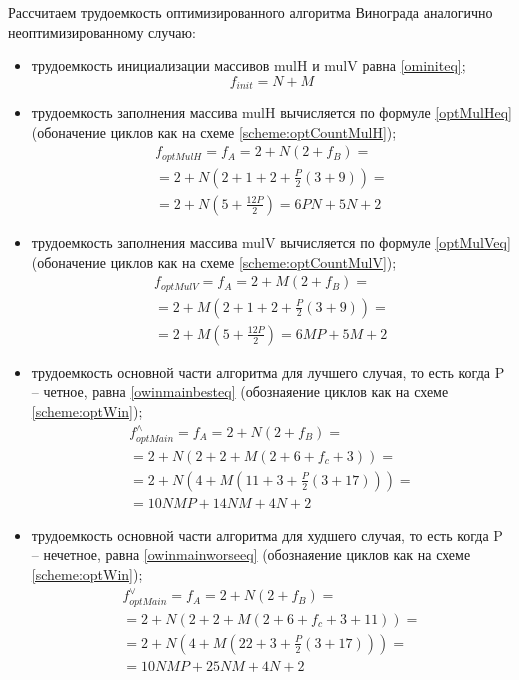 Рассчитаем трудоемкость оптимизированного алгоритма Винограда аналогично
неоптимизированному случаю:
\begin{itemize}[left=\parindent]
    \item трудоемкость инициализации массивов mulH и mulV равна \ref{ominiteq};
        \begin{equation}\label{ominiteq}
            f_{init} = N + M
        \end{equation}

    \item трудоемкость заполнения массива mulH вычисляется по формуле
        \ref{optMulHeq} (обоначение циклов как на схеме
        \ref{scheme:optCountMulH});
        \begin{multline}\label{optMulHeq}
            f_{optMulH} = f_A = 2 + N(2 + f_B) = \\ = 2 + N(2 + 1 + 2 +
            \frac{P}{2}(3 + 9)) = \\ = 2 + N(5 + \frac{12P}{2}) = 6PN
            + 5N + 2
        \end{multline}

    \item трудоемкость заполнения массива mulV вычисляется по формуле
        \ref{optMulVeq} (обоначение циклов как на схеме
        \ref{scheme:optCountMulV});
        \begin{multline}\label{optMulVeq}
            f_{optMulV} = f_A = 2 + M(2 + f_B) = \\ = 2 + M(2 + 1 + 2 +
            \frac{P}{2}(3 + 9)) = \\ = 2 + M(5 + \frac{12P}{2}) = 6MP + 5M + 2
        \end{multline}

    \item трудоемкость основной части алгоритма для лучшего случая, то есть
        когда P -- четное, равна \ref{owinmainbesteq} (обознаяение циклов как на
        схеме \ref{scheme:optWin});
        \begin{multline}\label{owinmainbesteq}
            f_{optMain}^{\wedge} = f_A = 2 + N(2 + f_B) = \\ =  2 + N(2 + 2 +
            M(2 + 6 + f_c + 3)) = \\ = 2 + N(4 + M(11 + 3 + \frac{P}{2}(3 +
            17))) = \\ = 10NMP + 14NM + 4N + 2
        \end{multline}

    \item трудоемкость основной части алгоритма для худшего случая, то есть
        когда P -- нечетное, равна \ref{owinmainworseeq} (обознаяение циклов как
        на схеме \ref{scheme:optWin});
        \begin{multline}\label{owinmainworseeq}
            f_{optMain}^{\vee} = f_A = 2 + N(2 + f_B) = \\ =  2 + N(2 + 2 + M(2 +
            6 + f_c + 3 + 11)) = \\ = 2 + N(4 + M(22 + 3 + \frac{P}{2}(3 +
            17))) = \\ = 10NMP + 25NM + 4N + 2
        \end{multline}
\end{itemize}

